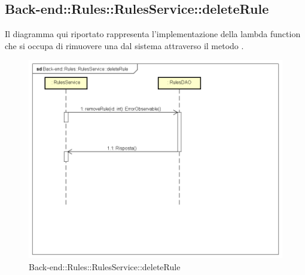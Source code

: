 \subsection{Back-end::Rules::RulesService::deleteRule}
Il diagramma qui riportato rappresenta l'implementazione della lambda function che si occupa di rimuovere una  dal sistema attraverso il metodo .
\begin{figure}[h] \centering \includegraphics[width=\textwidth,height=\textheight,keepaspectratio]{images/diagrams/back-end/Ufficial_Backend/Back-endRulesRulesServicedeleteRule.png} 	\caption{Back-end::Rules::RulesService::deleteRule}
\end{figure}
\newpage

